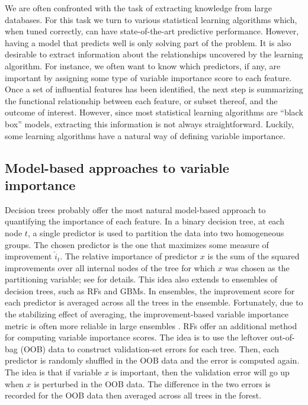 \documentclass[12pt]{article}
\begin{document}
We are often confronted with the task of extracting knowledge from large databases. For this task we turn to various statistical learning algorithms which, when tuned correctly, can have state-of-the-art predictive performance. However, having a model that predicts well is only solving part of the problem. It is also desirable to extract information about the relationships uncovered by the learning algorithm. For instance, we often want to know which predictors, if any, are important by assigning some type of variable importance score to each feature. Once a set of influential features has been identified, the next step is summarizing the functional relationship between each feature, or subset thereof, and the outcome of interest. However, since most statistical learning algorithms are ``black box'' models, extracting this information is not always straightforward. Luckily, some learning algorithms have a natural way of defining variable importance.


\subsection{Model-based approaches to variable importance}
\label{sec:model-based-vi}

Decision trees probably offer the most natural model-based approach to quantifying the importance of each feature. In a binary decision tree, at each node $t$, a single predictor is used to partition the data into two homogeneous groups. The chosen predictor is the one that maximizes some measure of improvement $\widehat{i}_t$. The relative importance of predictor $x$ is the sum of the squared improvements over all internal nodes of the tree for which $x$ was chosen as the partitioning variable; see \citet{classification-breiman-1984} for details. This idea also extends to ensembles of decision trees, such as RFs and GBMs. In ensembles, the improvement score for each predictor is averaged across all the trees in the ensemble. Fortunately, due to the stabilizing effect of averaging, the improvement-based variable importance metric is often more reliable in large ensembles \citep[pg. 368]{hastie-elements-2009}. RFs offer an additional method for computing variable importance scores. The idea is to use the leftover out-of-bag (OOB) data to construct validation-set errors for each tree. Then, each predictor is randomly shuffled in the OOB data and the error is computed again. The idea is that if variable $x$ is important, then the validation error will go up when $x$ is perturbed in the OOB data. The difference in the two errors is recorded for the OOB data then averaged across all trees in the forest.
\end{document}
